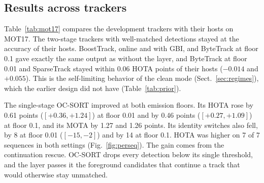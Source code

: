\documentclass[pdflatex,sn-mathphys-num,iicol]{sn-jnl}
\begin{document}
\subsection{Results across trackers}\label{sec:tracker}
Table~\ref{tab:mot17} compares the development trackers with their hosts on
MOT17. The two-stage trackers with well-matched detections stayed at the
accuracy of their hosts. BoostTrack, online and with GBI, and
ByteTrack at floor 0.1 gave exactly the same output as without the layer, and ByteTrack at floor 0.01 and
SparseTrack stayed within 0.06 HOTA points of their hosts ($-0.014$ and
$+0.055$). This is the
self-limiting behavior of the clean mode (Sect.~\ref{sec:regimes}), which
the earlier design did not have (Table~\ref{tab:prior}).

The single-stage OC-SORT improved at both emission floors. Its HOTA rose by
0.61 points ($[+0.36,+1.24]$) at floor 0.01 and by 0.46 points
($[+0.27,+1.09]$) at floor 0.1, and its MOTA by 1.27 and 1.26 points. Its identity switches also fell, by 8
at floor 0.01 ($[-15,-2]$) and by 14 at floor 0.1. HOTA
was higher on 7 of 7 sequences in both settings (Fig.~\ref{fig:perseq}). The
gain comes from the continuation rescue. OC-SORT drops every detection
below its single threshold, and the layer passes it the foreground candidates
that continue a track that would otherwise stay unmatched.
\end{document}
